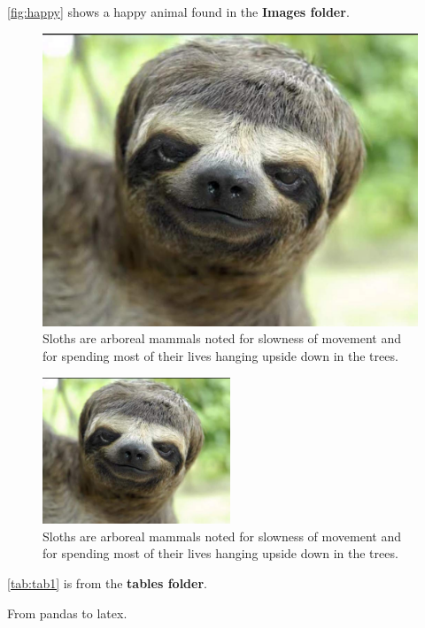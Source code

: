 \autoref{fig:happy} shows a happy animal found in the \textbf{Images folder}. 
\begin{figure}[H]
\begin{center}\includegraphics[scale=0.5]{latex-report/3_Images/Funny-Animal-Face} 
\end{center}
\caption{Sloths are arboreal mammals noted for slowness of movement and for spending most of their lives hanging upside down in the trees.}
\label{fig:happy}
\end{figure}


\begin{figure}[H]
\centering
\includegraphics[width=0.5\textwidth]{latex-report/3_Images/Funny-Animal-Face} 
\caption{Sloths are arboreal mammals noted for slowness of movement and for spending most of their lives hanging upside down in the trees.}
\label{fig:happy2}
\end{figure}



\autoref{tab:tab1} is from the \textbf{tables folder}. 
\begin{table}[H]
\caption{From pandas to latex.}
\centering
{}

\label{tab:tab1}
\end{table}

